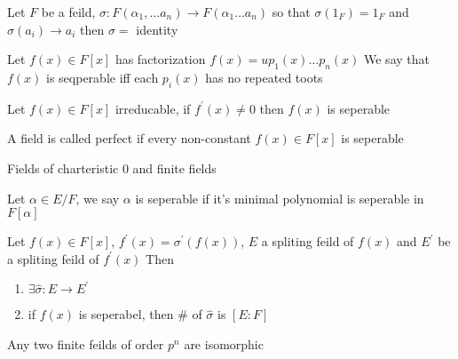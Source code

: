 
Let \(F\) be a feild, \(\sigma: F(\alpha_1, \ldots a_n ) \to F(\alpha_1 \ldots a_n )\) so that \(\sigma(1_F) = 1_F\) and \(\sigma(a_i) \to a_i\)
then \(\sigma =\) identity

\begin{definition}
    \label{def:seperable field}
    Let \(f(x) \in F[x]\) has factorization \(f(x) = u p_1(x) \ldots p_n(x)\)
    We say that \(f(x)\) is seqperable iff each \(p_i(x)\) has no repeated toots
\end{definition}  

Let \(f(x) \in F[x]\) irreducable, if \(f^\prime(x) \neq 0\) then \(f(x)\) is seperable

\begin{definition}[perfect]
    \label{def:perfect}
    A field is called perfect if every non-constant \(f(x) \in F[x]\) is seperable 
\end{definition}
\begin{example}
    \label{ex:perfect fields}
    Fields of charteristic \(0\) and finite fields 
\end{example} 


\begin{definition}
    \label{def:seperable element}
    Let \(\alpha \in E/F\), we say \(\alpha\) is seperable if it's minimal polynomial is seperable in \(F[\alpha]\)
\end{definition}

\begin{theorem}[1]
    \label{thm:1}
    Let \(f(x) \in F[x]\), \(f^\prime (x) = \sigma^\prime (f(x))\), \(E\) a spliting feild of \(f(x)\) and \(E^\prime \) be a spliting feild of \(f^\prime (x)\)
    Then \begin{enumerate}
        \item \(\exists \hat{\sigma}: E \to E^\prime \)
        \item if \(f(x)\) is seperabel, then # of \(\hat{\sigma}\) is \([E:F]\) 
    \end{enumerate}
\end{theorem}
\begin{corollary}
    Any two finite feilds of order \(p^n\) are isomorphic 	
\end{corollary} 
